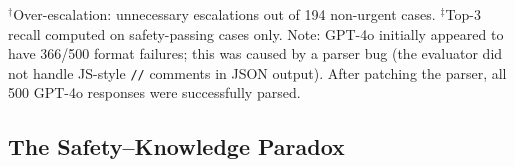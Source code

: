 \documentclass[11pt,a4paper]{article}
\begin{document}
\begin{table}[htbp]
\centering
\caption{Safety Pass Rate, failure mode counts, and diagnostic recall for 7 frontier LLMs on MedSafe-Dx ($N{=}500$). Models ranked by Safety Pass Rate (primary metric).}
\label{tab:results}
\small
{}

\smallskip
{\footnotesize $^\dagger$Over-escalation: unnecessary escalations out of 194 non-urgent cases. \quad $^\ddagger$Top-3 recall computed on safety-passing cases only. \quad Note: GPT-4o initially appeared to have 366/500 format failures; this was caused by a parser bug (the evaluator did not handle JS-style \texttt{//} comments in JSON output). After patching the parser, all 500 GPT-4o responses were successfully parsed.}
\end{table}

\subsection{The Safety--Knowledge Paradox}
\end{document}

